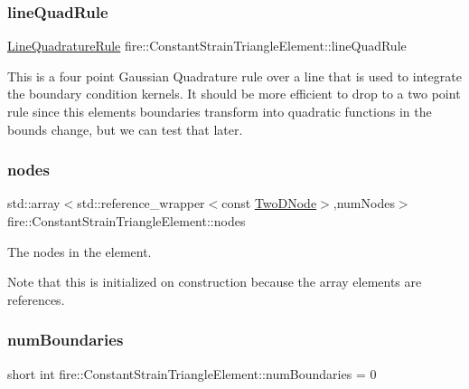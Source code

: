 \subsubsection{\texorpdfstring{line\+Quad\+Rule}{lineQuadRule}}
{\footnotesize\ttfamily \hyperlink{a00885}{Line\+Quadrature\+Rule} fire\+::\+Constant\+Strain\+Triangle\+Element\+::line\+Quad\+Rule\hspace{0.3cm}{\ttfamily [protected]}}

This is a four point Gaussian Quadrature rule over a line that is used to integrate the boundary condition kernels. It should be more efficient to drop to a two point rule since this element\textquotesingle{}s boundaries transform into quadratic functions in the bounds change, but we can test that later. \mbox{\label{a00789_add9415a1262a4d58136e1ef11507360b}} 
\subsubsection{\texorpdfstring{nodes}{nodes}}
{\footnotesize\ttfamily std\+::array$<$std\+::reference\+\_\+wrapper$<$const \hyperlink{a00210_a92dafcc05a788e1065a5792b67f0f70e}{Two\+D\+Node}$>$,num\+Nodes$>$ fire\+::\+Constant\+Strain\+Triangle\+Element\+::nodes\hspace{0.3cm}{\ttfamily [protected]}}

The nodes in the element.

Note that this is initialized on construction because the array elements are references. \mbox{\label{a00789_a70ceb410983c87c36546a2a95306dac6}} 
\subsubsection{\texorpdfstring{num\+Boundaries}{numBoundaries}}
{\footnotesize\ttfamily short int fire\+::\+Constant\+Strain\+Triangle\+Element\+::num\+Boundaries = 0\hspace{0.3cm}{\ttfamily [protected]}}


